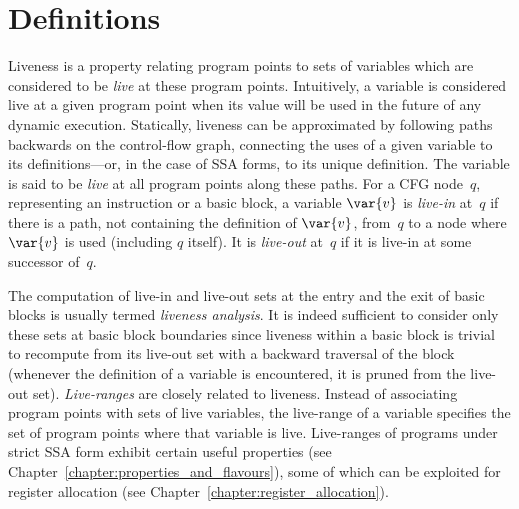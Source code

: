 \section{Definitions}
Liveness is a property relating program points to sets of variables which are considered to be \emph{live} at these program points.
Intuitively, a variable is considered live at a given program point when its value will be used in the future of any dynamic execution.
Statically, liveness can be approximated by following paths backwards on the control-flow graph, connecting the uses of a given variable to its definitions---or, in the case of SSA forms, to its unique definition.
The variable is said to be \emph{live} at all program points along these paths.
For a CFG node~$q$, representing an instruction or a basic block, a variable $\var{v}$ is \emph{live-in} at~$q$ if there is a path, not containing the definition of $\var{v}$, from~$q$ to a node where $\var{v}$ is used (including $q$ itself).
It is \emph{live-out} at~$q$ if it is live-in at some successor of~$q$.

The computation of live-in and live-out sets at the entry and the exit of basic blocks is usually termed \emph{liveness analysis}.
It is indeed sufficient to consider only these sets at basic block boundaries since liveness within a basic block is trivial to recompute from its live-out set with a backward traversal of the block (whenever the definition of a variable is encountered, it is pruned from the live-out set).
\emph{Live-ranges} are closely related to liveness.
Instead of associating program points with sets of live variables, the live-range of a variable specifies the set of program points where that variable is live.
Live-ranges of programs under strict SSA form exhibit certain useful properties (see Chapter~\ref{chapter:properties_and_flavours}), some of which can be exploited for register allocation (see Chapter~\ref{chapter:register_allocation}).

